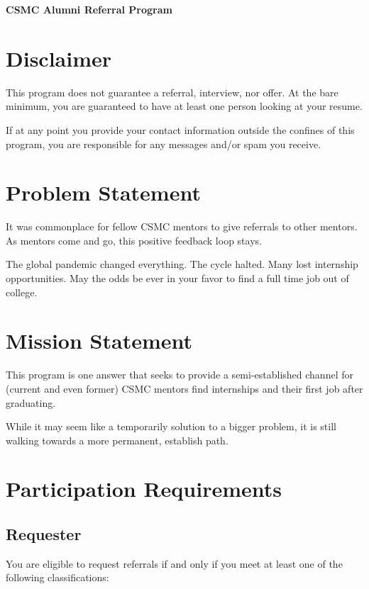 \documentclass[letterpaper, 12pt]{article}
\begin{document}
\begin{center}
    \bfseries\Large CSMC Alumni Referral Program
\end{center}

\section{Disclaimer}\label{section:disclaimer}

This program does not guarantee a referral, interview, nor offer. At the
bare minimum, you are guaranteed to have at least one person looking at your
resume.

If at any point you provide your contact information outside the confines of
this program, you are responsible for any messages and/or spam you
receive.\label{section:disclaimer:spamMessages}

\section{Problem Statement}

It was commonplace for fellow CSMC mentors to give referrals to other mentors.
As mentors come and go, this positive feedback loop stays.

The global pandemic changed everything. The cycle halted. Many lost internship
opportunities. May the odds be ever in your favor to find a full time job out of
college.

\section{Mission Statement}

This program is one answer that seeks to provide a semi-established channel for
(current and even former) CSMC mentors find internships and their first job after
graduating.

While it may seem like a temporarily solution to a bigger problem, it is still
walking towards a more permanent, establish path.

\section{Participation Requirements}

\subsection{Requester}

You are eligible to request referrals if and only if you meet at least one of
the following classifications:
\end{document}
